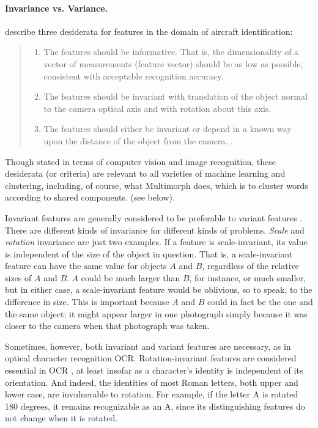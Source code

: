 \paragraph{Invariance vs. Variance.}
\cite{dudani-et-al:1977} describe three desiderata for features in the 
domain of aircraft identification:
\begin{quote}
\begin{enumerate}
\item The features should be informative. That is, the dimensionality of a 
vector of measurements (feature vector) should be as low as possible, 
consistent with acceptable recognition accuracy.
\item The features should be invariant with translation of the object 
normal to the camera optical axis and with rotation about this axis.
\item The features should either be invariant or depend in a known 
way upon the distance of the object from the camera.
\citep[][p. 40]{dudani-et-al:1977}.
\end{enumerate}
\end{quote}
Though stated in terms of computer vision and image recognition, 
these desiderata (or criteria) are relevant to all varieties of machine 
learning and clustering, including, of course, what Multimorph does, which is to
cluster words according to shared components.  
(see below).

Invariant features are generally considered to be preferable to variant 
features \citep{hossain-et-al:2012}. 
There are different kinds of invariance for different kinds of problems.
\emph{Scale} and \emph{rotation} invariance are just two examples. If a feature 
is scale-invariant, its
value is independent of the size of the object in question. That is, a 
scale-invariant feature
can have the same value for objects $A$ and $B$, regardless of the 
relative sizes of $A$ and $B$. $A$ could be much larger than $B$, for instance, or much smaller,
but in either case, a scale-invariant feature would be oblivious, so to speak, to the difference in size. 
This is important because $A$ and $B$ could in fact be the one and the same object; it might appear 
larger in one photograph simply because 
it was closer to the camera when that photograph was taken.

Sometimes, however, both invariant and variant features are necessary, 
as in optical character recognition \ac{OCR}\citep{trier-et-al:1996}.
Rotation-invariant features are considered essential in \ac{OCR} \citep{trier-et-al:1996}, 
at least
insofar as a character's identity is independent 
of its orientation.
And indeed, the identities of most Roman letters, both upper and lower case, are invulnerable to rotation.
For example, if the letter \textsf{A} is rotated 180 degrees, it remains 
recognizable as an \textsf{A}, since its distinguishing features do not change when it is rotated. 

